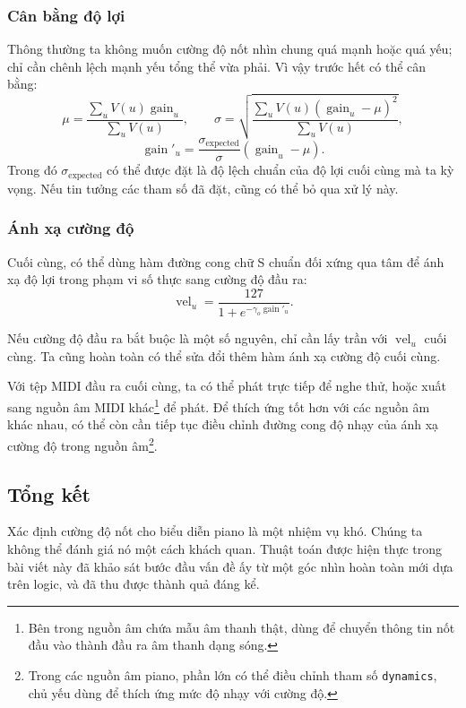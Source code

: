 \documentclass[11pt]{article}
\begin{document}
\subsubsection{Cân bằng độ lợi}

Thông thường ta không muốn cường độ nốt nhìn chung quá mạnh hoặc quá yếu; chỉ
cần chênh lệch mạnh yếu tổng thể vừa phải. Vì vậy trước hết có thể cân bằng:
\[
  \mu=\frac{\sum_u V(u)\operatorname{gain}_u}{\sum_u V(u)},\qquad
  \sigma=\sqrt{\frac{\sum_u V(u)(\operatorname{gain}_u-\mu)^2}{\sum_u V(u)}},
\]
\[
  \operatorname{gain}'_u=
  \frac{\sigma_{\operatorname{expected}}}{\sigma}
  (\operatorname{gain}_u-\mu).
\]
Trong đó \(\sigma_{\operatorname{expected}}\) có thể được đặt là độ lệch
chuẩn của độ lợi cuối cùng mà ta kỳ vọng. Nếu tin tưởng các tham số đã đặt,
cũng có thể bỏ qua xử lý này.

\subsubsection{Ánh xạ cường độ}

Cuối cùng, có thể dùng hàm đường cong chữ S chuẩn đối xứng qua tâm để ánh xạ
độ lợi trong phạm vi số thực sang cường độ đầu ra:
\[
  \operatorname{vel}_u=
  \frac{127}{1+e^{-\gamma_o\operatorname{gain}'_u}}.
\]

Nếu cường độ đầu ra bắt buộc là một số nguyên, chỉ cần lấy trần với
\(\operatorname{vel}_u\) cuối cùng. Ta cũng hoàn toàn có thể sửa đổi thêm hàm
ánh xạ cường độ cuối cùng.

Với tệp MIDI đầu ra cuối cùng, ta có thể phát trực tiếp để nghe thử, hoặc
xuất sang nguồn âm MIDI khác\footnote{Bên trong nguồn âm chứa mẫu âm thanh
thật, dùng để chuyển thông tin nốt đầu vào thành đầu ra âm thanh dạng sóng.}
để phát. Để thích ứng tốt hơn với các nguồn âm khác nhau, có thể còn cần tiếp
tục điều chỉnh đường cong độ nhạy của ánh xạ cường độ trong nguồn âm\footnote{
Trong các nguồn âm piano, phần lớn có thể điều chỉnh tham số \texttt{dynamics},
chủ yếu dùng để thích ứng mức độ nhạy với cường độ.}.

\subsection{Tổng kết}

Xác định cường độ nốt cho biểu diễn piano là một nhiệm vụ khó. Chúng ta không
thể đánh giá nó một cách khách quan. Thuật toán được hiện thực trong bài viết
này đã khảo sát bước đầu vấn đề ấy từ một góc nhìn hoàn toàn mới dựa trên
logic, và đã thu được thành quả đáng kể.
\end{document}
